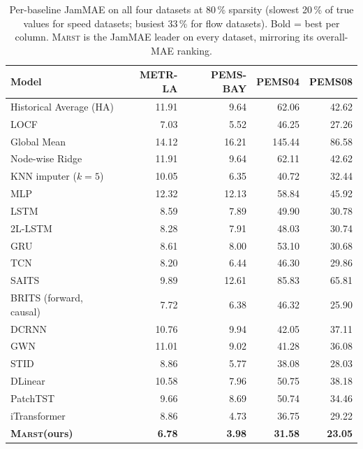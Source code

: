 \documentclass[11pt]{article}
\newcommand{\MARST}{\textsc{Marst}\xspace}
\begin{document}
\begin{table}[!htbp]
\centering
\caption{Per-baseline JamMAE on all four datasets at 80\,\% sparsity
(slowest 20\,\% of true values for speed datasets; busiest 33\,\% for
flow datasets).  Bold = best per column.  \MARST is the JamMAE leader
on every dataset, mirroring its overall-MAE ranking.}
\label{tab:jammae-full}
\small
\begin{tabular}{lrrrr}
\toprule
\textbf{Model} & \textbf{METR-LA} & \textbf{PEMS-BAY} & \textbf{PEMS04} & \textbf{PEMS08} \\
\midrule
Historical Average (HA)         & 11.91 &  9.64 &  62.06 & 42.62 \\
LOCF                            &  7.03 &  5.52 &  46.25 & 27.26 \\
Global Mean                     & 14.12 & 16.21 & 145.44 & 86.58 \\
Node-wise Ridge                 & 11.91 &  9.64 &  62.11 & 42.62 \\
KNN imputer ($k=5$)             & 10.05 &  6.35 &  40.72 & 32.44 \\
MLP                             & 12.32 & 12.13 &  58.84 & 45.92 \\
LSTM                            &  8.59 &  7.89 &  49.90 & 30.78 \\
2L-LSTM                         &  8.28 &  7.91 &  48.03 & 30.74 \\
GRU                             &  8.61 &  8.00 &  53.10 & 30.68 \\
TCN                             &  8.20 &  6.44 &  46.30 & 29.86 \\
SAITS                           &  9.89 & 12.61 &  85.83 & 65.81 \\
BRITS (forward, causal)         &  7.72 &  6.38 &  46.32 & 25.90 \\
DCRNN                           & 10.76 &  9.94 &  42.05 & 37.11 \\
GWN                             & 11.01 &  9.02 &  41.28 & 36.08 \\
STID                            &  8.86 &  5.77 &  38.08 & 28.03 \\
DLinear                         & 10.58 &  7.96 &  50.75 & 38.18 \\
PatchTST                        &  9.66 &  8.69 &  50.74 & 34.46 \\
iTransformer                    &  8.86 &  4.73 &  36.75 & 29.22 \\
\textbf{\MARST (ours)}          & \textbf{6.78} & \textbf{3.98} & \textbf{31.58} & \textbf{23.05} \\
\bottomrule
\end{tabular}
\end{table}
\end{document}
